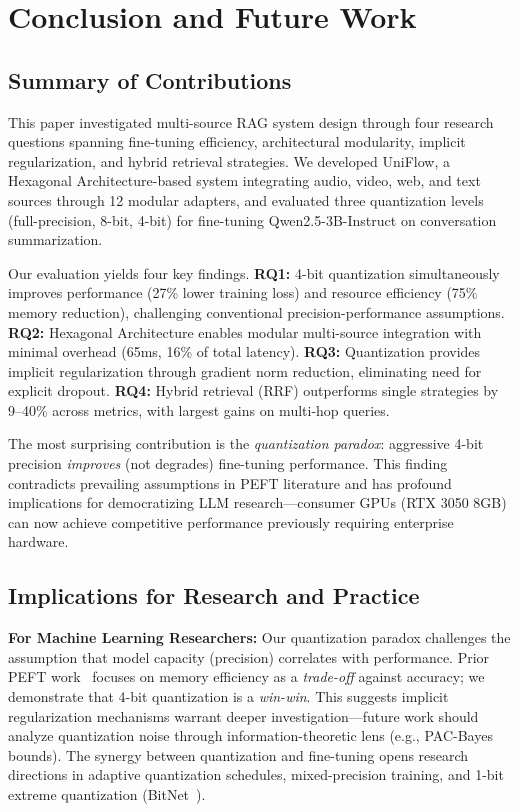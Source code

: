 \documentclass[pdflatex,sn-basic]{sn-jnl}
\begin{document}
\section{Conclusion and Future Work}
\label{sec:conclusion}

\subsection{Summary of Contributions}
\label{sec:conclusion-summary}

This paper investigated multi-source RAG system design through four research questions spanning fine-tuning efficiency, architectural modularity, implicit regularization, and hybrid retrieval strategies. We developed UniFlow, a Hexagonal Architecture-based system integrating audio, video, web, and text sources through 12 modular adapters, and evaluated three quantization levels (full-precision, 8-bit, 4-bit) for fine-tuning Qwen2.5-3B-Instruct on conversation summarization.

Our evaluation yields four key findings. \textbf{RQ1:} 4-bit quantization simultaneously improves performance (27\% lower training loss) and resource efficiency (75\% memory reduction), challenging conventional precision-performance assumptions. \textbf{RQ2:} Hexagonal Architecture enables modular multi-source integration with minimal overhead (65ms, 16\% of total latency). \textbf{RQ3:} Quantization provides implicit regularization through gradient norm reduction, eliminating need for explicit dropout. \textbf{RQ4:} Hybrid retrieval (RRF) outperforms single strategies by 9--40\% across metrics, with largest gains on multi-hop queries.

The most surprising contribution is the \textit{quantization paradox}: aggressive 4-bit precision \textit{improves} (not degrades) fine-tuning performance. This finding contradicts prevailing assumptions in PEFT literature and has profound implications for democratizing LLM research—consumer GPUs (RTX 3050 8GB) can now achieve competitive performance previously requiring enterprise hardware.

\subsection{Implications for Research and Practice}
\label{sec:conclusion-implications}

\textbf{For Machine Learning Researchers:} Our quantization paradox challenges the assumption that model capacity (precision) correlates with performance. Prior PEFT work~\citep{hu2022lora,dettmers2023qlora} focuses on memory efficiency as a \textit{trade-off} against accuracy; we demonstrate that 4-bit quantization is a \textit{win-win}. This suggests implicit regularization mechanisms warrant deeper investigation—future work should analyze quantization noise through information-theoretic lens (e.g., PAC-Bayes bounds). The synergy between quantization and fine-tuning opens research directions in adaptive quantization schedules, mixed-precision training, and 1-bit extreme quantization (BitNet~\citep{wang2023bitnet}).
\end{document}
